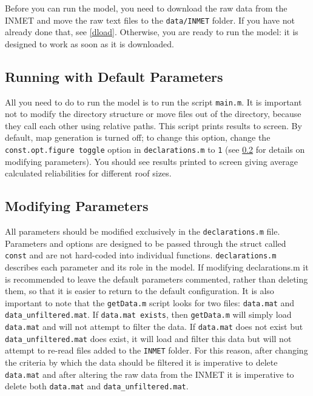 \documentclass[11pt]{article} %
\newcommand{\fn}[1]{\texttt{#1}} %
\newcommand{\code}[1]{\texttt{#1}} %
\begin{document}
Before you can run the model, you need to download the raw data from the \ac{INMET} and move the raw text files to the \fn{data/INMET} folder.
If you have not already done that, see \cref{dload}.
Otherwise, you are ready to run the model: it is designed to work as soon as it is downloaded.

\subsection{Running with Default Parameters} \label{defparam}

All you need to do to run the model is to run the script \fn{main.m}.
It is  important not to modify the directory structure or move files out of the directory, because they call each other using relative paths.
This script prints results to screen.
By default, map generation is turned off; to change this option, change the \code{const.opt.figure toggle} option in \fn{declarations.m} to \code{1} (see \cref{modparam} for details on modifying parameters).
You should see results printed to screen giving average calculated reliabilities for different roof sizes.

\subsection{Modifying Parameters} \label{modparam}

All parameters should be modified exclusively in the \fn{declarations.m} file.
Parameters and options are designed to be passed through the struct called \code{const} and are not hard-coded into individual functions. 
\fn{declarations.m} describes each parameter and its role in the model.
If modifying {declarations.m} it is recommended to leave the default parameters commented, rather than deleting them, so that it is easier to return to the default configuration.
It is also important to note that the \fn{getData.m} script looks for two files: \fn{data.mat} and \fn{data\_unfiltered.mat}. 
If \fn{data.mat exists}, then \fn{getData.m} will simply load \fn{data.mat} and will not attempt to filter the data.
If \fn{data.mat} does not exist but \fn{data\_unfiltered.mat} does exist, it will load and filter this data but will not attempt to re-read files added to the \fn{INMET} folder.
For this reason, after changing the criteria by which the data should be filtered it is imperative to delete \fn{data.mat} and after altering the raw data from the \ac{INMET} it is imperative to delete both \fn{data.mat} and \fn{data\_unfiltered.mat}.
\end{document}
